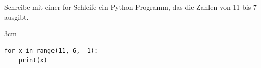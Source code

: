\question[3]
Schreibe mit einer for-Schleife ein Python-Programm, das die Zahlen von 11 bis 7 ausgibt.

\begin{solutionbox}{3cm}
\begin{lstlisting}
for x in range(11, 6, -1):
    print(x)
\end{lstlisting}
\end{solutionbox}